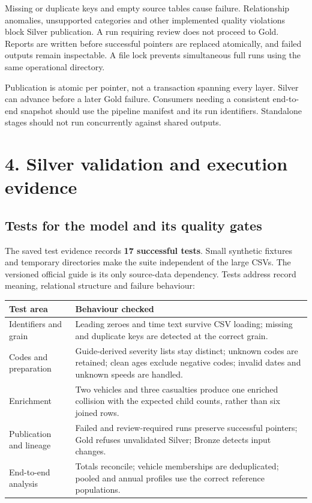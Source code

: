 \documentclass[10pt,a4paper]{article}
\newcommand{\heading}[1]{\section*{\color{accent}#1}}
\newcommand{\subheading}[1]{\subsection*{#1}}
\begin{document}
Missing or duplicate keys and empty source tables cause failure. Relationship anomalies, unsupported categories and other implemented quality violations block Silver publication. A run requiring review does not proceed to Gold. Reports are written before successful pointers are replaced atomically, and failed outputs remain inspectable. A file lock prevents simultaneous full runs using the same operational directory.

Publication is atomic per pointer, not a transaction spanning every layer. Silver can advance before a later Gold failure. Consumers needing a consistent end-to-end snapshot should use the pipeline manifest and its run identifiers. Standalone stages should not run concurrently against shared outputs.

\newpage
\heading{4. Silver validation and execution evidence}
\subheading{Tests for the model and its quality gates}
The saved test evidence records \textbf{17 successful tests}. Small synthetic fixtures and temporary directories make the suite independent of the large CSVs. The versioned official guide is its only source-data dependency. Tests address record meaning, relational structure and failure behaviour:

\begin{center}\small
\begin{tabular}{p{40mm}p{112mm}}
\toprule Test area & Behaviour checked\\\midrule
Identifiers and grain & Leading zeroes and time text survive CSV loading; missing and duplicate keys are detected at the correct grain.\\
Codes and preparation & Guide-derived severity lists stay distinct; unknown codes are retained; clean ages exclude negative codes; invalid dates and unknown speeds are handled.\\
Enrichment & Two vehicles and three casualties produce one enriched collision with the expected child counts, rather than six joined rows.\\
Publication and lineage & Failed and review-required runs preserve successful pointers; Gold refuses unvalidated Silver; Bronze detects input changes.\\
End-to-end analysis & Totals reconcile; vehicle memberships are deduplicated; pooled and annual profiles use the correct reference populations.\\\bottomrule
\end{tabular}\end{center}
\end{document}
